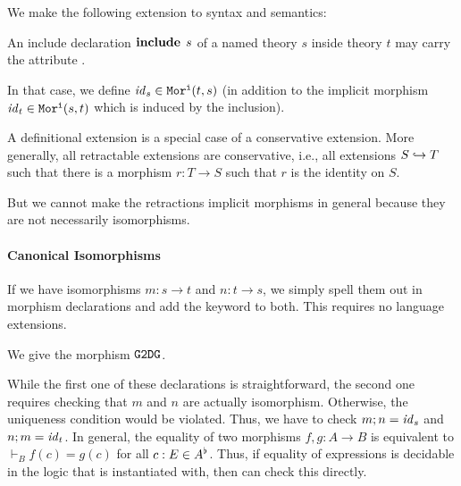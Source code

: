 We make the following extension to syntax and semantics:
\begin{compactitem}
  \item An include declaration $\operatorname{\mathbf{include}}{\;s}$ of a named theory $s$ inside theory $t$ may carry the attribute .
  \item In that case, we define $\mathit{id}_{s}\in\mathtt{Mor^i}(t,s)$ (in addition to the implicit morphism $\mathit{id}_{t}\in\mathtt{Mor^i}(s,t)$ which is induced by the inclusion).
\end{compactitem}


\begin{remark}
A definitional extension is a special case of a conservative extension.
More generally, all retractable extensions are conservative, i.e., all extensions $S\hookrightarrow T$ such that there is a morphism $r:T\to S$ such that $r$ is the identity on $S$.

But we cannot make the retractions implicit morphisms in general because they are not necessarily isomorphisms.
\end{remark}

\paragraph{Canonical Isomorphisms}
If we have isomorphisms $m:s\to t$ and $n:t\to s$, we simply spell them out in morphism declarations and add the keyword  to both.
This requires no language extensions.

\begin{example}\label{group:iso}
We give the morphism $\operatorname{\mathtt{G2DG}}$.
\end{example}

While the first one of these declarations is straightforward, the second one requires checking that $m$ and $n$ are actually isomorphism.
Otherwise, the uniqueness condition would be violated.
Thus, we have to check $m;n=\mathit{id}_{s}$ and $n;m=\mathit{id}_{t}$.
In general, the equality of two morphisms $f,g:A\to B$ is equivalent to $\vdash_B f(c)=g(c)$ for all $c:E\in A^\flat$.
Thus, if equality of expressions is decidable in the logic that \mmt is instantiated with, then \mmt can check this directly.

